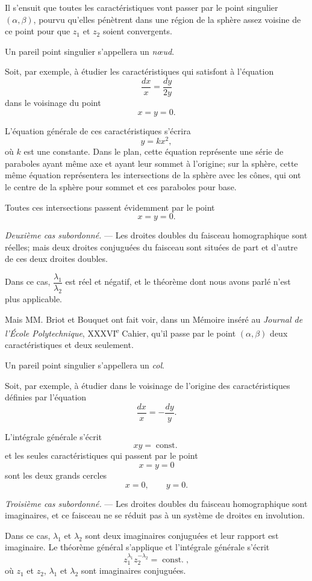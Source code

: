 \documentclass[11pt]{article}
\begin{document}
Il s’ensuit que toutes les caractéristiques vont passer par le point singulier $(\alpha,\beta)$, pourvu qu’elles pénètrent dans une région de la sphère assez voisine de ce point pour que $z_1$ et $z_2$ soient convergents.

Un pareil point singulier s’appellera un \emph{nœud}.

Soit, par exemple, à étudier les caractéristiques qui satisfont à l’équation
\[
\frac{dx}{x}=\frac{dy}{2y}
\]
dans le voisinage du point
\[
x=y=0.
\]

L’équation générale de ces caractéristiques s’écrira
\[
y=kx^2,
\]
où $k$ est une constante. Dans le plan, cette équation représente une série de paraboles ayant même axe et ayant leur sommet à l’origine; sur la sphère, cette même équation représentera les intersections de la sphère avec les cônes, qui ont le centre de la sphère pour sommet et ces paraboles pour base.

Toutes ces intersections passent évidemment par le point
\[
x=y=0.
\]

\emph{Deuxième cas subordonné.} --- Les droites doubles du faisceau homographique sont réelles; mais deux droites conjuguées du faisceau sont situées de part et d’autre de ces deux droites doubles.

Dans ce cas, $\dfrac{\lambda_1}{\lambda_2}$ est réel et négatif, et le théorème dont nous avons parlé n’est plus applicable.

Mais MM. Briot et Bouquet ont fait voir, dans un Mémoire inséré au \emph{Journal de l’École Polytechnique}, XXXVI\textsuperscript{e} Cahier, qu’il passe par le point $(\alpha,\beta)$ deux caractéristiques et deux seulement.

Un pareil point singulier s’appellera un \emph{col}.

Soit, par exemple, à étudier dans le voisinage de l’origine des caractéristiques définies par l’équation
\[
\frac{dx}{x}=-\frac{dy}{y}.
\]

L’intégrale générale s’écrit
\[
xy=\operatorname{const.}
\]
et les seules caractéristiques qui passent par le point
\[
x=y=0
\]
sont les deux grands cercles
\[
x=0,\qquad y=0.
\]

\emph{Troisième cas subordonné.} --- Les droites doubles du faisceau homographique sont imaginaires, et ce faisceau ne se réduit pas à un système de droites en involution.

Dans ce cas, $\lambda_1$ et $\lambda_2$ sont deux imaginaires conjuguées et leur rapport est imaginaire. Le théorème général s’applique et l’intégrale générale s’écrit
\[
z_1^{\lambda_1}z_2^{-\lambda_2}=\operatorname{const.},
\]
où $z_1$ et $z_2$, $\lambda_1$ et $\lambda_2$ sont imaginaires conjuguées.
\end{document}
